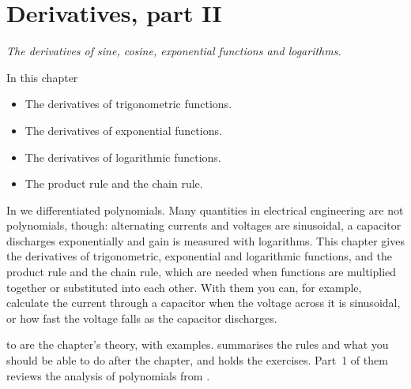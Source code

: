
\chapter{Derivatives, part II}
\label{c13:ch}

{\large\itshape The derivatives of sine, cosine, exponential functions and logarithms.\par}

\begin{chapterbox}{In this chapter}
\begin{itemize}
  \item The derivatives of trigonometric functions.
  \item The derivatives of exponential functions.
  \item The derivatives of logarithmic functions.
  \item The product rule and the chain rule.
\end{itemize}
\end{chapterbox}

In  we differentiated polynomials. Many quantities in electrical engineering are not
polynomials, though: alternating currents and voltages are sinusoidal, a capacitor discharges
exponentially and gain is measured with logarithms. This chapter gives the derivatives of
trigonometric, exponential and logarithmic functions, and the product rule and the chain rule,
which are needed when functions are multiplied together or substituted into each other. With them
you can, for example, calculate the current through a capacitor when the voltage across it is
sinusoidal, or how fast the voltage falls as the capacitor discharges.

 to  are the chapter's theory, with examples.
 summarises the rules and what you should be able to do after the
chapter, and  holds the exercises. Part~1 of them reviews the analysis
of polynomials from .




